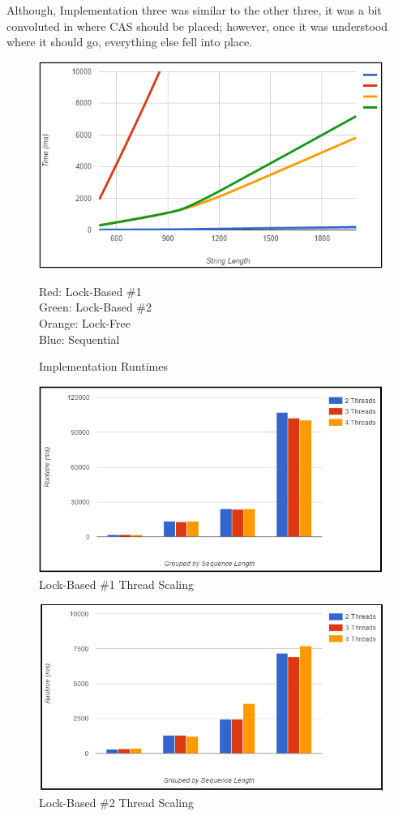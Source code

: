 \documentclass[letterpaper, 10 pt, conference]{IEEEconf}
\begin{document}
Although, Implementation three was similar to the other three, it was a bit convoluted in where CAS should be placed; however, once it was understood where it should go, everything else fell into place. 


\begin{figure}
	\centering
	\includegraphics[scale=0.6]{sequential_vs_parallel}
	\caption{Implementation Runtimes}
	\medskip
	\small
	Red: Lock-Based \#1\\ Green: Lock-Based \#2\\ Orange: Lock-Free\\ Blue: Sequential    
\end{figure}

\begin{figure}
	\centering
	\includegraphics[scale=0.6]{parallel1}
	\caption{Lock-Based \#1 Thread Scaling} 
\end{figure}

\begin{figure}
	\centering
	\includegraphics[scale=0.6]{parallel2-lock}
	\caption{Lock-Based \#2 Thread Scaling} 
\end{figure}
\end{document}
